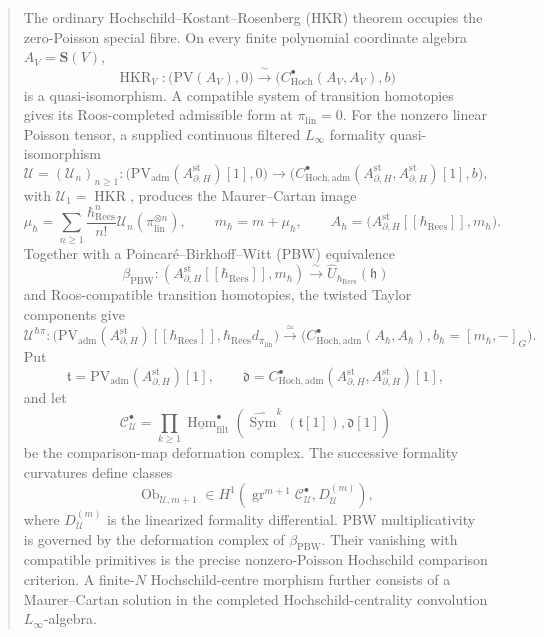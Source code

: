 \begin{abstract}
\medskip\noindent
The ordinary Hochschild--Kostant--Rosenberg (HKR) theorem occupies the
zero-Poisson special fibre.  On every finite polynomial coordinate
algebra \(A_V=\mathbf S(V)\),
\[
  \operatorname{HKR}_V\colon
  \bigl(\mathrm{PV}(A_V),0\bigr)
  \xrightarrow{\ \sim\ }
  \bigl(C^\bullet_{\mathrm{Hoch}}(A_V,A_V),b\bigr)
\]
is a quasi-isomorphism.  A compatible system of transition homotopies
gives its Roos-completed admissible form at \(\pi_{\mathrm{lin}}=0\).
For the nonzero linear Poisson tensor, a supplied continuous filtered
\(L_\infty\) formality quasi-isomorphism
\[
  \mathcal U=(\mathcal U_n)_{n\geq1}\colon
  \bigl(
    \mathrm{PV}_{\mathrm{adm}}
      (A^{\mathrm{st}}_{\partial,H})[1],0\bigr)
  \longrightarrow
  \bigl(
    C^\bullet_{\mathrm{Hoch},\mathrm{adm}}
      (A^{\mathrm{st}}_{\partial,H},
       A^{\mathrm{st}}_{\partial,H})[1],b\bigr),
\]
with
\(\mathcal U_1=\operatorname{HKR}\), produces the Maurer--Cartan image
\[
  \mu_\hbar
  =\sum_{n\geq1}
    \frac{\hbar_{\mathrm{Rees}}^n}{n!}
    \mathcal U_n(\pi_{\mathrm{lin}}^{\otimes n}),
  \qquad
  m_\hbar=m+\mu_\hbar,
  \qquad
  A_\hbar=
  \bigl(A^{\mathrm{st}}_{\partial,H}
    [[\hbar_{\mathrm{Rees}}]],m_\hbar\bigr).
\]
Together with a Poincar\'e--Birkhoff--Witt (PBW) equivalence
\[
  \beta_{\mathrm{PBW}}\colon
  (A^{\mathrm{st}}_{\partial,H}[[\hbar_{\mathrm{Rees}}]],m_\hbar)
  \xrightarrow{\ \sim\ }
  \widehat U_{\hbar_{\mathrm{Rees}}}(\mathfrak h)
\]
and Roos-compatible transition homotopies, the twisted Taylor components
give
\[
  \mathcal U^{\hbar\pi}\colon
  \bigl(
    \mathrm{PV}_{\mathrm{adm}}(A^{\mathrm{st}}_{\partial,H})
      [[\hbar_{\mathrm{Rees}}]],
    \hbar_{\mathrm{Rees}}d_{\pi_{\mathrm{lin}}}\bigr)
  \xrightarrow{\ \simeq\ }
  \bigl(
    C^\bullet_{\mathrm{Hoch},\mathrm{adm}}(A_\hbar,A_\hbar),
    b_\hbar=[m_\hbar,-]_G\bigr).
\]
Put
\[
  \mathfrak t
  =\mathrm{PV}_{\mathrm{adm}}
    (A^{\mathrm{st}}_{\partial,H})[1],
  \qquad
  \mathfrak d
  =C^\bullet_{\mathrm{Hoch},\mathrm{adm}}
    (A^{\mathrm{st}}_{\partial,H},
     A^{\mathrm{st}}_{\partial,H})[1],
\]
and let
\[
  \mathcal C^\bullet_{\mathcal U}
  =\prod_{k\geq1}
    \underline{\operatorname{Hom}}^\bullet_{\mathrm{filt}}
    \left(
      \widehat{\operatorname{Sym}}^k(\mathfrak t[1]),
      \mathfrak d[1]\right)
\]
be the comparison-map deformation complex.  The successive formality
curvatures define classes
\[
  \operatorname{Ob}_{\mathcal U,m+1}
  \in
  H^1\!\left(
    \operatorname{gr}^{m+1}\mathcal C^\bullet_{\mathcal U},
    D^{(m)}_{\mathcal U}\right),
\]
where \(D^{(m)}_{\mathcal U}\) is the linearized formality differential.
PBW multiplicativity is governed by the deformation complex of
\(\beta_{\mathrm{PBW}}\).  Their vanishing with compatible primitives is
the precise nonzero-Poisson Hochschild comparison criterion.  A
finite-\(N\) Hochschild-centre morphism further consists of a
Maurer--Cartan solution in the completed Hochschild-centrality
convolution \(L_\infty\)-algebra.


\end{abstract}
